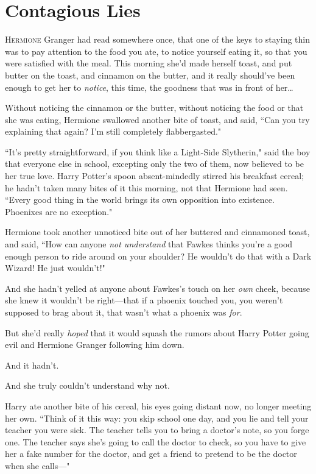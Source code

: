 \chapter{Contagious Lies}

\lettrine{H}{ermione} Granger had read somewhere once, that one of the keys to staying thin was to pay attention to the food you ate, to notice yourself eating it, so that you were satisfied with the meal. This morning she'd made herself toast, and put butter on the toast, and cinnamon on the butter, and it really should've been enough to get her to \emph{notice}, this time, the goodness that was in front of her{\ldots}

Without noticing the cinnamon or the butter, without noticing the food or that she was eating, Hermione swallowed another bite of toast, and said, ``Can you try explaining that again? I'm still completely flabbergasted."

``It's pretty straightforward, if you think like a Light-Side Slytherin," said the boy that everyone else in school, excepting only the two of them, now believed to be her true love. Harry Potter's spoon absent-mindedly stirred his breakfast cereal; he hadn't taken many bites of it this morning, not that Hermione had seen. ``Every good thing in the world brings its own opposition into existence. Phoenixes are no exception."

Hermione took another unnoticed bite out of her buttered and cinnamoned toast, and said, ``How can anyone \emph{not understand} that Fawkes thinks you're a good enough person to ride around on your shoulder? He wouldn't do that with a Dark Wizard! He just wouldn't!"

And she hadn't yelled at anyone about Fawkes's touch on her \emph{own} cheek, because she knew it wouldn't be right---that if a phoenix touched you, you weren't supposed to brag about it, that wasn't what a phoenix was \emph{for}.

But she'd really \emph{hoped} that it would squash the rumors about Harry Potter going evil and Hermione Granger following him down.

And it hadn't.

And she truly couldn't understand why not.

Harry ate another bite of his cereal, his eyes going distant now, no longer meeting her own. ``Think of it this way: you skip school one day, and you lie and tell your teacher you were sick. The teacher tells you to bring a doctor's note, so you forge one. The teacher says she's going to call the doctor to check, so you have to give her a fake number for the doctor, and get a friend to pretend to be the doctor when she calls---"

